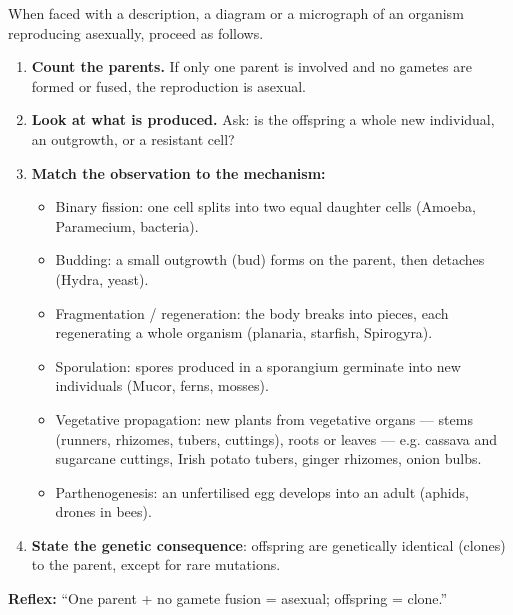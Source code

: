 \documentclass[11pt]{article}
\newcommand{\cle}[1]{{\popxbold\color{popdark}#1}}
\begin{document}
\begin{methode}
When faced with a description, a diagram or a micrograph of an organism reproducing asexually, proceed as follows.
\begin{enumerate}
\item \textbf{Count the parents.} If only \cle{one parent} is involved and no gametes are formed or fused, the reproduction is asexual.
\item \textbf{Look at what is produced.} Ask: is the offspring a whole new individual, an outgrowth, or a resistant cell?
\item \textbf{Match the observation to the mechanism:}
\begin{itemize}
\item \cle{Binary fission}: one cell splits into two equal daughter cells (Amoeba, Paramecium, bacteria).
\item \cle{Budding}: a small outgrowth (bud) forms on the parent, then detaches (Hydra, yeast).
\item \cle{Fragmentation / regeneration}: the body breaks into pieces, each regenerating a whole organism (planaria, starfish, Spirogyra).
\item \cle{Sporulation}: spores produced in a sporangium germinate into new individuals (Mucor, ferns, mosses).
\item \cle{Vegetative propagation}: new plants from vegetative organs — stems (runners, rhizomes, tubers, cuttings), roots or leaves — e.g. cassava and sugarcane cuttings, Irish potato tubers, ginger rhizomes, onion bulbs.
\item \cle{Parthenogenesis}: an unfertilised egg develops into an adult (aphids, drones in bees).
\end{itemize}
\item \textbf{State the genetic consequence}: offspring are \cle{genetically identical} (clones) to the parent, except for rare mutations.
\end{enumerate}
\textbf{Reflex:} ``One parent + no gamete fusion = asexual; offspring = clone.''
\end{methode}
\end{document}
